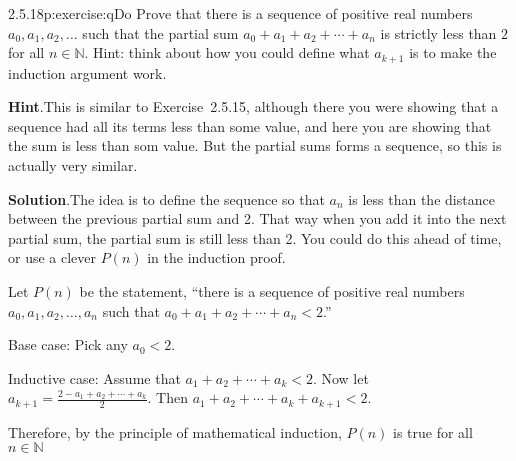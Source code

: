 \documentclass[twoside,11pt,]{book}
\newcommand{\blocktitlefont}{\relax}
\numberwithin{equation}{chapter}
\newcommand{\N}{\mathbb N}
\newcommand{\lt}{<}
\begin{document}
\begin{divisionsolution}{2.5.18}{}{p:exercise:qDo}%
Prove that there is a sequence of positive real numbers \(a_0, a_1, a_2, \ldots\) such that the partial sum \(a_0 + a_1 + a_2 + \cdots + a_n\) is strictly less than \(2\) for all \(n \in \N\). Hint: think about how you could define what \(a_{k+1}\) is to make the induction argument work.%
\par\smallskip%
\noindent\textbf{\blocktitlefont Hint}.\quad{}This is similar to Exercise~2.5.15, although there you were showing that a sequence had all its terms less than some value, and here you are showing that the sum is less than som value.  But the partial sums forms a sequence, so this is actually very similar.%
\par\smallskip%
\noindent\textbf{\blocktitlefont Solution}.\quad{}The idea is to define the sequence so that \(a_n\) is less than the distance between the previous partial sum and 2. That way when you add it into the next partial sum, the partial sum is still less than 2. You could do this ahead of time, or use a clever \(P(n)\) in the induction proof.%
\begin{solutionproof}
Let \(P(n)\) be the statement, ``there is a sequence of positive real numbers \(a_0, a_1, a_2, \ldots,
a_n\) such that \(a_0 + a_1 + a_2 + \cdots + a_n \lt 2\).''%
\par
Base case: Pick any \(a_0 \lt 2\).%
\par
Inductive case: Assume that \(a_1 + a_2 + \cdots + a_k \lt 2\). Now let \(a_{k+1} = \frac{2- a_1 + a_2 + \cdots + a_k}{2}\). Then \(a_1 + a_2 + \cdots +a_k + a_{k+1} \lt 2\).%
\par
Therefore, by the principle of mathematical induction, \(P(n)\) is true for all \(n \in \N\)%
\end{solutionproof}
\end{divisionsolution}%
\end{document}

